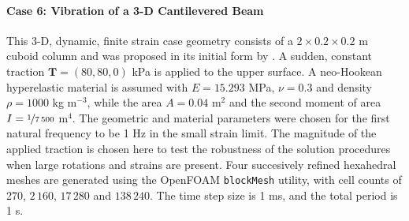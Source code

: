 \documentclass[sn-mathphys,Numbered]{sn-jnl}%
\newcommand{\bb}{\boldsymbol}
\begin{document}
\paragraph{Case 6: Vibration of a 3-D Cantilevered Beam}
This 3-D, dynamic, finite strain case geometry consists of a $2 \times 0.2 \times 0.2$ m cuboid column and was proposed in its initial form by \citet{Tukovic2007}.
A sudden, constant traction $\bb{T} = \left(80, 80, 0 \right)$ kPa is applied to the upper surface.
A neo-Hookean hyperelastic material is assumed with $E = 15.293$ MPa, $\nu = 0.3$ and density $\rho = 1000$ kg m$^{-3}$, while the area $A = 0.04$ m$^2$ and the second moment of area $I = \nicefrac{1}{7\,500}$ m$^4$. %
The geometric and material parameters were chosen for the first natural frequency to be 1 Hz in the small strain limit.
The magnitude of the applied traction is chosen here to test the robustness of the solution procedures when large rotations and strains are present.
Four succesively refined hexahedral meshes are generated using the OpenFOAM \texttt{blockMesh} utility, with cell counts of 270, $2\,160$, $17\,280$ and $138\,240$.
The time step size is 1 ms, and the total period is 1 s.
\end{document}
